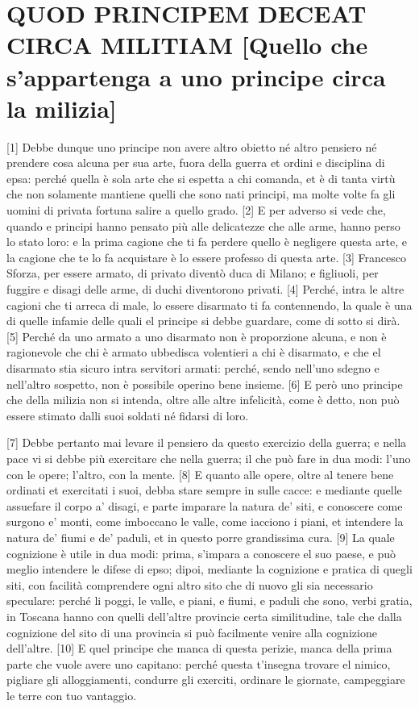 \quebra\section{QUOD PRINCIPEM DECEAT CIRCA MILITIAM\break
{[}Quello che s'appartenga a uno principe circa la milizia{]}}

{[}1{]} Debbe dunque uno principe non avere altro obietto né altro
pensiero né prendere cosa alcuna per sua arte, fuora della guerra et
ordini e disciplina di epsa: perché quella è sola arte che si espetta a
chi comanda, et è di tanta virtù che non solamente mantiene quelli che
sono nati principi, ma molte volte fa gli uomini di privata fortuna
salire a quello grado. {[}2{]} E per adverso si vede che, quando e
principi hanno pensato più alle delicatezze che alle arme, hanno perso
lo stato loro: e la prima cagione che ti fa perdere quello è negligere
questa arte, e la cagione che te lo fa acquistare è lo essere professo
di questa arte. {[}3{]} Francesco Sforza, per essere armato, di privato
diventò duca di Milano; e figliuoli, per fuggire e disagi delle arme, di
duchi diventorono privati. {[}4{]} Perché, intra le altre cagioni che ti
arreca di male, lo essere disarmato ti fa contennendo, la quale è una di
quelle infamie delle quali el principe si debbe guardare, come di sotto
si dirà. {[}5{]} Perché da uno armato a uno disarmato non è proporzione
alcuna, e non è ragionevole che chi è armato ubbedisca volentieri a chi
è disarmato, e che el disarmato stia sicuro intra servitori armati:
perché, sendo nell'uno sdegno e nell'altro sospetto, non è possibile
operino bene insieme. {[}6{]} E però uno principe che della milizia non
si intenda, oltre alle altre infelicità, come è detto, non può essere
stimato dalli suoi soldati né fidarsi di loro.

{[}7{]} Debbe pertanto mai levare il pensiero da questo exercizio della
guerra; e nella pace vi si debbe più exercitare che nella guerra; il che
può fare in dua modi: l'uno con le opere; l'altro, con la mente. {[}8{]}
E quanto alle opere, oltre al tenere bene ordinati et exercitati i suoi,
debba stare sempre in sulle cacce: e mediante quelle assuefare il corpo
a' disagi, e parte imparare la natura de' siti, e conoscere come surgono
e' monti, come imboccano le valle, come iacciono i piani, et intendere
la natura de' fiumi e de' paduli, et in questo porre grandissima cura.
{[}9{]} La quale cognizione è utile in dua modi: prima, s'impara a
conoscere el suo paese, e può meglio intendere le difese di epso; dipoi,
mediante la cognizione e pratica di quegli siti, con facilità
comprendere ogni altro sito che di nuovo gli sia necessario speculare:
perché li poggi, le valle, e piani, e fiumi, e paduli che sono, verbi
gratia, in Toscana hanno con quelli dell'altre provincie certa
similitudine, tale che dalla cognizione del sito di una provincia si può
facilmente venire alla cognizione dell'altre. {[}10{]} E quel principe
che manca di questa perizie, manca della prima parte che vuole avere uno
capitano: perché questa t'insegna trovare el nimico, pigliare gli
alloggiamenti, condurre gli exerciti, ordinare le giornate, campeggiare
le terre con tuo vantaggio.

